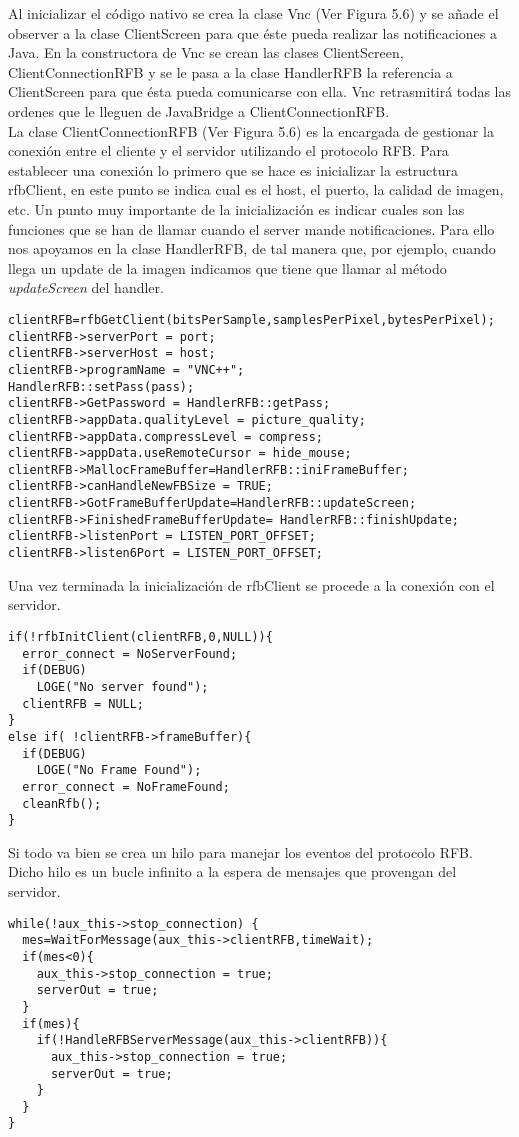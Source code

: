 Al inicializar el código nativo se crea la clase Vnc (Ver Figura 5.6) y se añade el observer a la clase ClientScreen para que éste pueda realizar las notificaciones a Java. En la constructora de Vnc se crean las clases ClientScreen, ClientConnectionRFB y se le pasa a la clase HandlerRFB la referencia a ClientScreen para que ésta pueda comunicarse con ella. Vnc retrasmitirá todas las ordenes que le lleguen de JavaBridge a ClientConnectionRFB.\\

La clase ClientConnectionRFB (Ver Figura 5.6) es la encargada de gestionar la conexión entre el cliente y el servidor utilizando el protocolo RFB. Para establecer una conexión lo primero que se hace es inicializar la estructura rfbClient, en este punto se indica cual es el host, el puerto, la calidad de imagen, etc. Un punto muy importante de la inicialización es indicar cuales son las funciones que se han de llamar cuando el server mande notificaciones. Para ello nos apoyamos en la clase HandlerRFB, de tal manera que, por ejemplo, cuando llega un update de la imagen indicamos que tiene que llamar al método \emph{updateScreen} del handler.
\begin{lstlisting}
clientRFB=rfbGetClient(bitsPerSample,samplesPerPixel,bytesPerPixel);
clientRFB->serverPort = port;
clientRFB->serverHost = host;
clientRFB->programName = "VNC++";
HandlerRFB::setPass(pass);
clientRFB->GetPassword = HandlerRFB::getPass;
clientRFB->appData.qualityLevel = picture_quality;
clientRFB->appData.compressLevel = compress;
clientRFB->appData.useRemoteCursor = hide_mouse;
clientRFB->MallocFrameBuffer=HandlerRFB::iniFrameBuffer;
clientRFB->canHandleNewFBSize = TRUE;
clientRFB->GotFrameBufferUpdate=HandlerRFB::updateScreen;
clientRFB->FinishedFrameBufferUpdate= HandlerRFB::finishUpdate;
clientRFB->listenPort = LISTEN_PORT_OFFSET;
clientRFB->listen6Port = LISTEN_PORT_OFFSET;
\end{lstlisting}

Una vez terminada la inicialización de rfbClient se procede a la conexión con el servidor.
\begin{lstlisting}
if(!rfbInitClient(clientRFB,0,NULL)){
  error_connect = NoServerFound;
  if(DEBUG)
    LOGE("No server found");
  clientRFB = NULL;
}
else if( !clientRFB->frameBuffer){
  if(DEBUG)
    LOGE("No Frame Found");
  error_connect = NoFrameFound;
  cleanRfb();
}
\end{lstlisting}

Si todo va bien se crea un hilo para manejar los eventos del protocolo RFB. Dicho hilo es un bucle infinito a la espera de mensajes que provengan del servidor.
\begin{lstlisting}
while(!aux_this->stop_connection) {
  mes=WaitForMessage(aux_this->clientRFB,timeWait);
  if(mes<0){
    aux_this->stop_connection = true;
    serverOut = true;
  }
  if(mes){
    if(!HandleRFBServerMessage(aux_this->clientRFB)){
      aux_this->stop_connection = true;
      serverOut = true;
    }
  }
}
\end{lstlisting}


